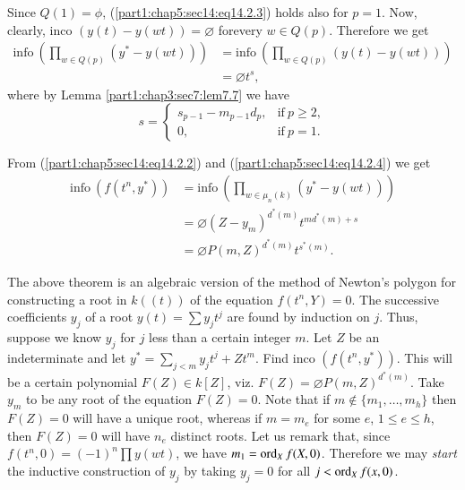 Since $Q(1) = \phi$, (\ref{part1:chap5:sec14:eq14.2.3}) holds also
for $p=1$. Now, clearly, inco $(y(t) - y(wt))= \diameter$
for\pageoriginale every $w \in Q(p)$. Therefore we get
\begin{align*}
  \text{info}~ \left( \prod_{w \in Q(p)} (y^* - y(wt)) \right) & =
  \text{info}~ \left( \prod_{w \in Q(p)} (y(t) - y(wt))\right)\\
  & = \diameter t^s,\tag{14.2.4}\label{part1:chap5:sec14:eq14.2.4} 
\end{align*}
where by Lemma \ref{part1:chap3:sec7:lem7.7} we have
$$
s=
\begin{cases}
  s_{p-1}-m_{p-1}d_p, & \text{if}~ p \geq 2,\\
  0, & \text{if}~ p=1.
\end{cases}
$$

From (\ref{part1:chap5:sec14:eq14.2.2}) and
(\ref{part1:chap5:sec14:eq14.2.4}) we get
\begin{align*}
  \text{info}~ (f(t^n, y^*)) &= \text{info}~ \left(\prod_{w \in \mu_n
    (k)} (y^* - y(wt)) \right)\\
  & = \diameter (Z- y_m)^{d^*(m)}t^{md^*(m)+s}\\
  & = \diameter P(m, Z)^{d^*(m)} t^{s^*(m)}.
\end{align*}

\begin{remark}\label{part1:chap5:sec14:rem14.3} 
The above theorem is an algebraic version of the method of Newton's
polygon for constructing a root in $k((t))$ of the equation $f(t^n,
Y)=0$. The successive coefficients $y_j$ of a root $y(t) = \sum y_j
t^j$ are found by induction on $j$. Thus, suppose we know $y_j$ for
$j$ less than a certain integer $m$. Let $Z$ be an indeterminate and
let $y^*= \displaystyle{\sum_{j < m} y_j t^j + Z t^m}$. Find inco
$(f(t^n, y^*))$. This will be a certain polynomial $F(Z)\in k[Z]$,
viz. $F(Z)= \diameter P (m, Z)^{d^*(m)}$. Take $y_m$ to be any root of
the equation $F(Z)=0$. Note that if $m \notin \{ m_1, \ldots , m_h\}$
then $F(Z)=0$ will have a unique root, whereas if $m=m_e$ for some
$e$, $1\leq e \leq h$, then $F(Z)=0$ will have $n_e$ distinct
roots. Let us remark that, since $f(t^n, 0)=(-1)^n \prod y (wt)$, we
have $m_1 = \operatorname{ord}_X f(X, 0)$. Therefore we may {\em start} the
inductive construction of $y_j$ by taking $y_j =0$ for all $j< \operatorname{ord}_X
f(x, 0)$.
\end{remark}
